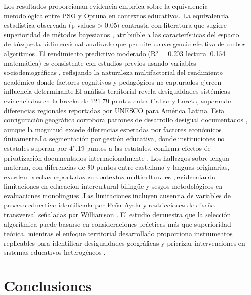 \documentclass[conference]{IEEEtran}
\begin{document}
Los resultados proporcionan evidencia empírica sobre la equivalencia metodológica entre PSO y Optuna en contextos educativos. La equivalencia estadística observada (p-values > 0.05) contrasta con literatura que sugiere superioridad de métodos bayesianos \cite{bergstra2013making, akiba2019optuna}, atribuible a las características del espacio de búsqueda bidimensional analizado que permite convergencia efectiva de ambos algoritmos \cite{liu2020improved}.El rendimiento predictivo moderado (R² = 0.203 lectura, 0.154 matemática) es consistente con estudios previos usando variables sociodemográficas \cite{romero2020educational, dutt2017systematic}, reflejando la naturaleza multifactorial del rendimiento académico donde factores cognitivos y pedagógicos no capturados ejercen influencia determinante.El análisis territorial revela desigualdades sistémicas evidenciadas en la brecha de 121.79 puntos entre Callao y Loreto, superando diferencias regionales reportadas por UNESCO \cite{unesco2021education} para América Latina. Esta configuración geográfica corrobora patrones de desarrollo desigual documentados \cite{webb2013conexion}, aunque la magnitud excede diferencias esperadas por factores económicos únicamente.La segmentación por gestión educativa, donde instituciones no estatales superan por 47.19 puntos a las estatales, confirma efectos de privatización documentados internacionalmente \cite{kremer2013role}. Los hallazgos sobre lengua materna, con diferencias de 90 puntos entre castellano y lenguas originarias, exceden brechas reportadas en contextos multiculturales \cite{garcia2017multilingual}, evidenciando limitaciones en educación intercultural bilingüe y sesgos metodológicos en evaluaciones monolingües \cite{unesco2016ethnic}.Las limitaciones incluyen ausencia de variables de proceso educativo identificada por Peña-Ayala \cite{pena2014educational} y restricciones de diseño transversal señaladas por Williamson \cite{williamson2020datafication}. El estudio demuestra que la selección algorítmica puede basarse en consideraciones prácticas más que superioridad teórica, mientras el enfoque territorial desarrollado proporciona instrumentos replicables para identificar desigualdades geográficas y priorizar intervenciones en sistemas educativos heterogéneos \cite{gonzalez2023edmcolombia}.

\section{Conclusiones}
\end{document}
